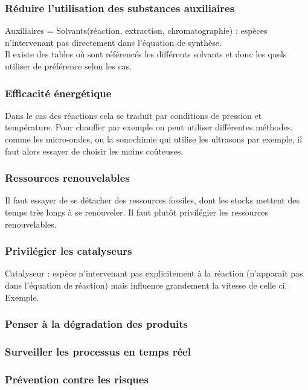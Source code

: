 \documentclass[12pt,prb,aps,epsf]{article}
\begin{document}
\subsubsection{Réduire l'utilisation des substances auxiliaires}
Auxiliaires = Solvants(réaction, extraction, chromatographie) : espèces n'intervenant pas directement dans l'équation de synthèse.\\
Il existe des tables où sont référencés les différents solvants et donc les quels utiliser de préférence selon les cas.

\subsubsection{Efficacité énergétique}
Dans le cas des réactions cela se traduit par conditions de pression et température. Pour chauffer par exemple on peut utiliser différentes méthodes, comme les micro-ondes, ou la sonochimie qui utilise les ultrasons par exemple, il faut alors essayer de choisir les moins coûteuses.

\subsubsection{Ressources renouvelables}
Il faut essayer de se détacher des ressources fossiles, dont les stocks mettent des temps très longs à se renouveler. Il faut plutôt privilégier les ressources renouvelables. 

\subsubsection{Privilégier les catalyseurs}
Catalyseur : espèce n'intervenant pas explicitement à la réaction (n'apparaît pas dans l'équation de réaction) mais influence grandement la vitesse de celle ci.\\Exemple.

\subsubsection{Penser à la dégradation des produits}

\subsubsection{Surveiller les processus en temps réel}

\subsubsection{Prévention contre les risques}
\end{document}

